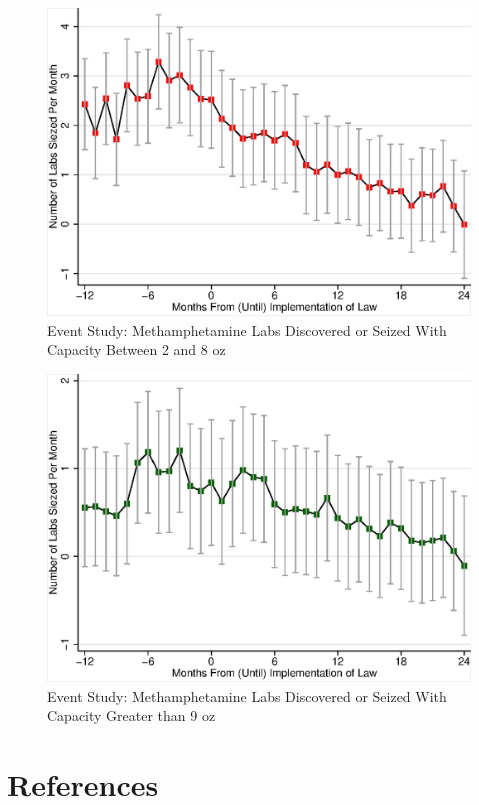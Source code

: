 \documentclass[
  11pt,
]{article}
\begin{document}
\begin{figure}[!hbtp]
 \centering
 \includegraphics{confidence-interval-plot-for-cap_2_8_oz.eps}
 \caption{Event Study: Methamphetamine Labs Discovered or Seized With Capacity Between 2 and 8 oz}
\label{ci-cap2-8}
\end{figure}

\begin{figure}[!hbtp]
 \centering
 \includegraphics{confidence-interval-plot-for-cap_above_9_oz.eps}
 \caption{Event Study: Methamphetamine Labs Discovered or Seized With Capacity Greater than 9 oz}
\label{ci-cap9}
\end{figure}

\newpage

\hypertarget{references}{%
\section*{References}\label{references}}
\end{document}
